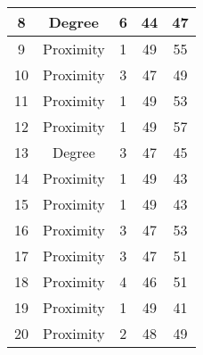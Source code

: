 \documentclass[results.tex]{subfiles}
\begin{document}
\begin{center}
\begin{tabular}{| c || c | c | c | c |}
            \hline
            8                       & Degree                       & 6                      & 44                      & 47                   \\
            \hline
            9                       & Proximity                    & 1                      & 49                      & 55                   \\
            \hline
            10                      & Proximity                    & 3                      & 47                      & 49                   \\
            \hline
            11                      & Proximity                    & 1                      & 49                      & 53                   \\
            \hline
            12                      & Proximity                    & 1                      & 49                      & 57                   \\
            \hline
            13                      & Degree                       & 3                      & 47                      & 45                   \\
            \hline
            14                      & Proximity                    & 1                      & 49                      & 43                   \\
            \hline
            15                      & Proximity                    & 1                      & 49                      & 43                   \\
            \hline
            16                      & Proximity                    & 3                      & 47                      & 53                   \\
            \hline
            17                      & Proximity                    & 3                      & 47                      & 51                   \\
            \hline
            18                      & Proximity                    & 4                      & 46                      & 51                   \\
            \hline
            19                      & Proximity                    & 1                      & 49                      & 41                   \\
            \hline
            20                      & Proximity                    & 2                      & 48                      & 49                   \\

\end{tabular}
\end{center}
\end{document}
